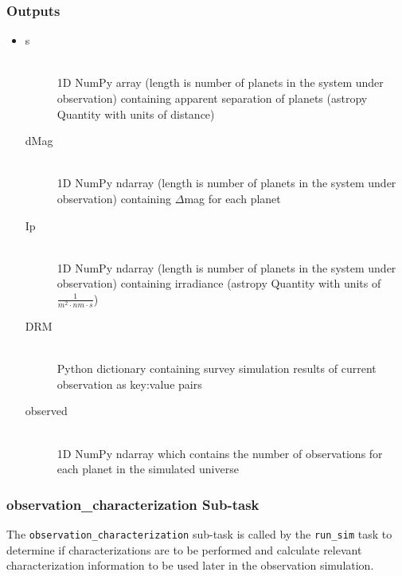 \documentclass[cleanfoot]{asme2ej}
\begin{document}
\subsubsection*{Outputs}
\begin{itemize}
    \item 
    \begin{description}
        \item[s] \hfill \\
        1D NumPy array (length is number of planets in the system under observation) containing apparent separation of planets (astropy Quantity with units of distance)
        \item[dMag] \hfill \\
        1D NumPy ndarray (length is number of planets in the system under observation) containing $ \Delta $mag for each planet
        \item[Ip] \hfill \\
        1D NumPy ndarray (length is number of planets in the system under observation) containing irradiance (astropy Quantity with units of $ \frac{1}{m^2 \cdot nm \cdot s} $)
        \item[DRM] \hfill \\
        Python dictionary containing survey simulation results of current observation as key:value pairs
        \item[observed] \hfill \\
        1D NumPy ndarray which contains the number of observations for each planet in the simulated universe
    \end{description}
\end{itemize}

\subsubsection{observation\_characterization Sub-task} \label{sec:observationcharacterizationtask}
The \verb+observation_characterization+ sub-task is called by the \verb+run_sim+ task to determine if characterizations are to be performed and calculate relevant characterization information to be used later in the observation simulation.
\end{document}

